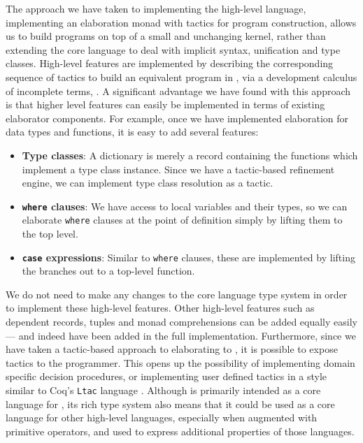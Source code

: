 The approach we have taken to implementing the high-level language,
implementing an elaboration monad with tactics for program construction, allows
us to build programs on top of a small and unchanging kernel, rather than
extending the core language to deal with implicit syntax, unification and type
classes.  High-level \Idris{} features are implemented by describing the
corresponding sequence of tactics to build an equivalent program in \TT{}, via
a development calculus of incomplete terms, \TTdev{}. A significant advantage
we have found with this approach is that higher level features can easily be
implemented in terms of existing elaborator components. For example, once we
have implemented elaboration for data types and functions, it is easy to add
several features:

\begin{itemize}
\item \textbf{Type classes}: A dictionary is merely a record containing the
functions which implement a type class instance. Since we have a tactic-based
refinement engine, we can implement type class resolution as a tactic.
\item \textbf{\texttt{where} clauses}: We have access to local variables and
their types, so we can
elaborate \texttt{where} clauses at the point of definition simply by lifting
them to the top level. 
\item \textbf{\texttt{case} expressions}: Similar to \texttt{where} clauses,
these are implemented by lifting the branches out to a top-level function.
\end{itemize}

We do not need to make any changes to the core language type system in order to 
implement these high-level features. 
Other high-level features such as dependent records, tuples and monad comprehensions
can be added equally easily --- and indeed have been added in the full implementation.  
Furthermore, 
since we have taken a tactic-based approach to elaborating \Idris{} to \TT{},
it is possible to expose tactics to the programmer. This opens up
the possibility of implementing domain specific decision procedures, or
implementing user defined tactics in a style similar to Coq's \texttt{Ltac}
language \cite{Delahaye2000}.  Although \TT{} is primarily intended as a core
language for \Idris{}, its rich type system also means that it could be used
as a core language for other high-level languages, especially when augmented
with primitive operators, and used to express additional properties of those
languages.  

